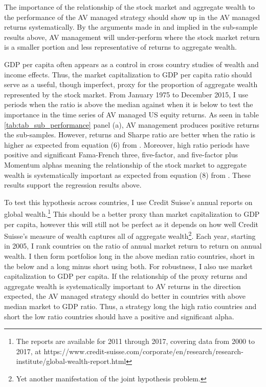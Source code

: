 The importance of the relationship of the stock market and aggregate wealth to the performance of the AV managed strategy should show up in the AV managed returns systematically. By the arguments made in \citet{pollet_average_2010} and implied in the sub-sample results above, AV management will under-perform where the stock market return is a smaller portion and less representative of returns to aggregate wealth. 

GDP per capita  often appears as a control in cross country studies of wealth and income effects. \citep{barro_cross-country_1989,levine_what_1993,baird_aggregate_2010} Thus, the market capitalization to GDP per capita ratio should serve as a useful, though imperfect, proxy for the proportion of aggregate wealth represented by the stock market. From January 1975 to December 2015, I use periods when the ratio is above the median against when it is below to test the importance in the time series of AV managed US equity returns. As seen in table \ref{tab:tab_sub_performance} panel (a), AV management produces positive returns the sub-samples. However, returns and Sharpe ratio are better when the ratio is higher as expected from equation (6) from \citet{pollet_average_2010}. Moreover, high ratio periods have positive and significant Fama-French three, five-factor, and five-factor plus Momentum alphas meaning the relationship of the stock market to aggregate wealth is systematically important as expected from equation (8) from \citet{pollet_average_2010}. These results support the regression results above.

To test this hypothesis across countries, I use Credit Suisse's annual reports on global wealth.\footnote{The reports are available for 2011 through 2017, covering data from 2000 to 2017, at https://www.credit-suisse.com/corporate/en/research/research-institute/global-wealth-report.html} This should be a better proxy than market capitalization to GDP per capita, however this will still not be perfect as it depends on how well Credit Suisse's measure of wealth captures all of aggregate wealth\footnote{Yet another manifestation of the joint hypothesis problem.}. Each year, starting in 2005, I rank countries on the ratio of annual market return to return on annual wealth. I then form portfolios long in the above median ratio countries, short in the below and a long minus short using both. For robustness, I also use market capitalization to GDP per capita. If the relationship of the proxy returns and aggregate wealth is systematically important to AV returns in the direction expected, the AV managed strategy should do better in countries with above median market to GDP ratio. Thus, a strategy long the high ratio countries and short the low ratio countries should have a positive and significant alpha. 

